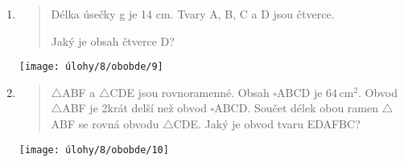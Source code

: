 \begin{enumerate}
\begin{minipage}[t]{\linewidth}
    \end{minipage}

    \item
    \begin{minipage}[t]{\linewidth}
        \begin{quote}
            Délka úsečky g je 14 cm. Tvary A, B, C a D jsou čtverce.

            Jaký je obsah čtverce D?
        \end{quote}
        \centering
        \texttt{[image: úlohy/8/obobde/9]}

    \end{minipage}

    \item
    \begin{minipage}[t]{\linewidth}
        \begin{quote}
            $\triangle$ABF a $\triangle$CDE jsou rovnoramenné.
            Obsah $\square$ABCD je $64\,\text{cm}^{2}$.
            Obvod $\triangle$ABF je 2krát delší než obvod $\square$ABCD. Součet délek obou ramen $\triangle$ABF se rovná obvodu $\triangle$CDE. Jaký je obvod tvaru EDAFBC?
        \end{quote}
        \centering
        \texttt{[image: úlohy/8/obobde/10]}

    \end{minipage}
\end{enumerate}


\newpage

